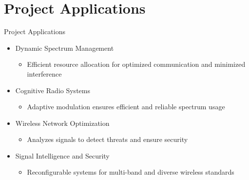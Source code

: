 \section{Project Applications}
\begin{frame}{Project Applications}
    \begin{itemize}
        \item Dynamic Spectrum Management
        \begin{itemize}
            \item Efficient resource allocation for optimized communication and minimized interference
        \end{itemize}
        \item Cognitive Radio Systems
        \begin{itemize}
            \item Adaptive modulation ensures efficient and reliable spectrum usage
        \end{itemize}
        \item Wireless Network Optimization
        \begin{itemize}
            \item Analyzes signals to detect threats and ensure security
        \end{itemize}
        \item Signal Intelligence and Security
        \begin{itemize}
            \item Reconfigurable systems for multi-band and diverse wireless standards
        \end{itemize}
    \end{itemize}
\end{frame}
